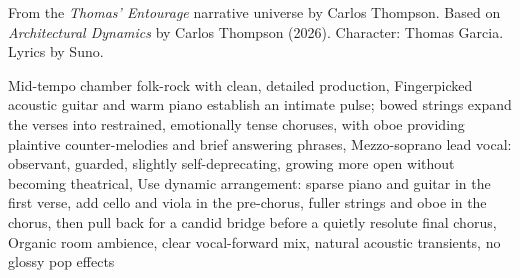 
\begin{notes}
From the \emph{Thomas’ Entourage} narrative universe by Carlos Thompson. Based on \emph{Architectural Dynamics} by Carlos Thompson (2026). Character: Thomas Garcia. Lyrics by Suno.
\end{notes}
\begin{style}
Mid-tempo chamber folk-rock with clean, detailed production, Fingerpicked acoustic guitar and warm piano establish an intimate pulse; bowed strings expand the verses into restrained, emotionally tense choruses, with oboe providing plaintive counter-melodies and brief answering phrases, Mezzo-soprano lead vocal: observant, guarded, slightly self-deprecating, growing more open without becoming theatrical, Use dynamic arrangement: sparse piano and guitar in the first verse, add cello and viola in the pre-chorus, fuller strings and oboe in the chorus, then pull back for a candid bridge before a quietly resolute final chorus, Organic room ambience, clear vocal-forward mix, natural acoustic transients, no glossy pop effects
\end{style}

